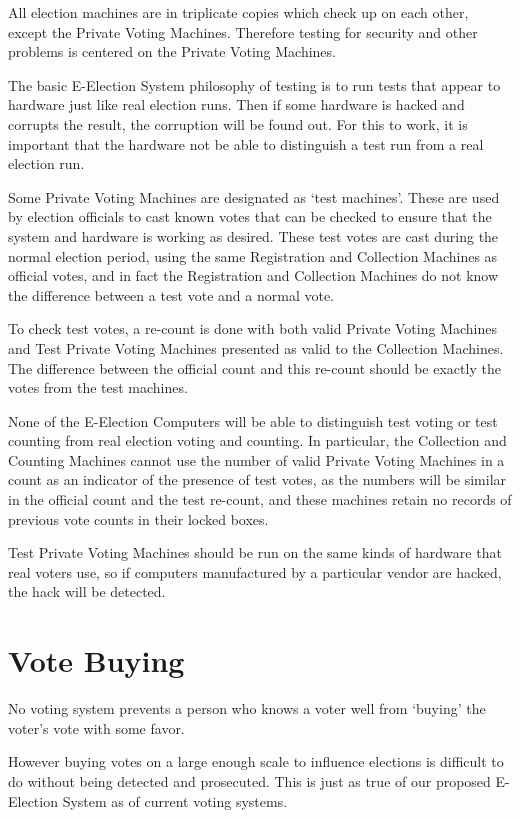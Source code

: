 \documentclass[12pt]{article}
\begin{document}
All election machines are in triplicate copies which check up on each
other, except the Private Voting Machines.  Therefore testing
for security and other problems is centered on the Private Voting
Machines.

The basic E-Election System philosophy of testing is to run tests
that appear to hardware just like real election runs.  Then if
some hardware is hacked and corrupts the result, the corruption
will be found out.  For this to work, it is important that the
hardware not be able to distinguish a test run from a real election run.

Some Private Voting Machines are designated as
`test machines'\label{TEST-MACHINE}.
These are used by election officials to cast known votes that can
be checked to ensure that the system and hardware is working as
desired.  These test votes are cast during the normal election
period, using the same Registration and Collection Machines
as official votes, and in fact the Registration and Collection Machines
do not know the difference between a test vote and a normal vote.

To check test votes, a re-count is done with both valid Private Voting
Machines and Test Private Voting Machines presented as valid to the
Collection Machines.  The difference between the official count and
this re-count should be exactly the votes from the test machines.

None of the E-Election Computers will be able to distinguish
test voting or test counting from real election voting and counting.
In particular, the Collection and Counting Machines cannot use the
number of valid Private Voting Machines in a count as an indicator
of the presence of test votes, as the numbers will be similar in the
official count and the test re-count, and these machines retain no
records of previous vote counts in their locked boxes.

Test Private Voting Machines should be run on the same kinds of
hardware that real voters use, so if computers manufactured by a
particular vendor are hacked, the hack will be detected.


\section{Vote Buying}

No voting system prevents a person who knows a voter well from
`buying' the voter's vote with some favor.

However buying votes on a large enough scale to influence elections
is difficult to do without being detected and prosecuted.
This is just as true of our proposed E-Election System as of
current voting systems.
\end{document}
